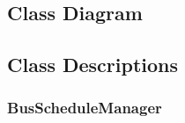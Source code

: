 \documentclass[pdftex,12pt,letter]{article}
\begin{document}
\subsection{Class Diagram}
\subsection{Class Descriptions}
\subsubsection{BusScheduleManager}

\end{document}
